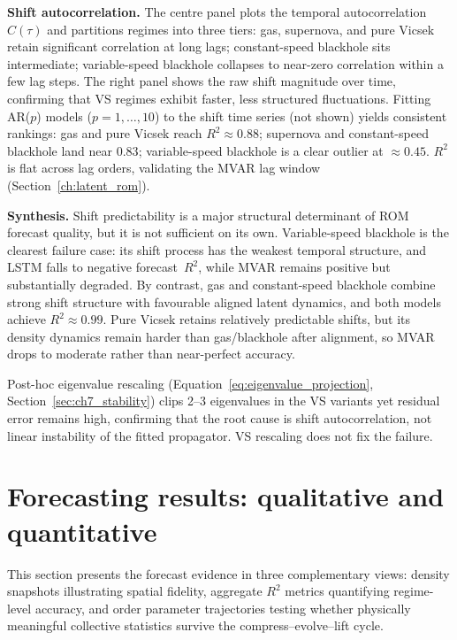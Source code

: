 \noindent\textbf{Shift autocorrelation.}
The centre panel plots the temporal autocorrelation $C(\tau)$ and partitions
regimes into three tiers: gas, supernova, and pure Vicsek retain significant
correlation at long lags; constant-speed blackhole sits intermediate;
variable-speed blackhole collapses to near-zero correlation within a few lag
steps.  The right panel shows the raw shift magnitude over time, confirming
that VS regimes exhibit faster, less structured fluctuations.
Fitting AR($p$) models ($p=1,\ldots,10$) to the shift time series
(not shown) yields consistent rankings: gas and pure Vicsek reach
$R^2\!\approx\!0.88$; supernova and constant-speed blackhole land near
$0.83$; variable-speed blackhole is a clear outlier at $\approx\!0.45$.
$R^2$ is flat across lag orders, validating the MVAR lag window
(Section~\ref{ch:latent_rom}).

\noindent\textbf{Synthesis.}
Shift predictability is a major structural determinant of ROM forecast
quality, but it is not sufficient on its own.  Variable-speed blackhole
is the clearest failure case: its shift process has the weakest temporal
structure, and LSTM falls to negative forecast~$R^2$, while MVAR remains
positive but substantially degraded.  By contrast, gas and constant-speed
blackhole combine strong shift structure with favourable aligned latent
dynamics, and both models achieve $R^2\!\approx\!0.99$.  Pure Vicsek
retains relatively predictable shifts, but its density dynamics remain
harder than gas/blackhole after alignment, so MVAR drops to moderate
rather than near-perfect accuracy.

Post-hoc eigenvalue rescaling
(Equation~\ref{eq:eigenvalue_projection}, Section~\ref{sec:ch7_stability})
clips 2--3 eigenvalues in the VS variants yet residual error remains high,
confirming that the root cause is shift autocorrelation, not linear
instability of the fitted propagator.  VS rescaling does not fix the
failure.

\section{Forecasting results: qualitative and quantitative}
\label{sec:ch7_forecasting_results}

This section presents the forecast evidence in three complementary views:
density snapshots illustrating spatial fidelity, aggregate $R^2$ metrics
quantifying regime-level accuracy, and order parameter trajectories testing
whether physically meaningful collective statistics survive the
compress--evolve--lift cycle.

